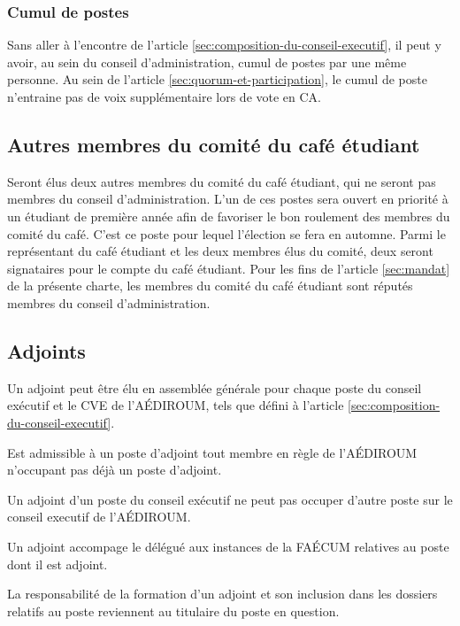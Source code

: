 \documentclass{aediroum}
\newcommand{\article}[1]{article \ref{#1}}
\begin{document}
\subsubsection{Cumul de postes}\label{sec:cumul-de-postes}

Sans aller à l'encontre de l'\article{sec:composition-du-conseil-executif}, il peut y avoir, au sein du conseil d'administration, cumul de postes par une même personne. Au sein de l'\article{sec:quorum-et-participation}, le cumul de poste n'entraine pas de voix supplémentaire lors de vote en CA.

\subsection{Autres membres du comité du café étudiant}\label{sec:autres-membres-du-comite-du-cafe-etudiant}

Seront élus deux autres membres du comité du café étudiant, qui ne seront pas membres du conseil d'administration. L'un de ces postes sera ouvert en priorité à un étudiant de première année afin de favoriser le bon roulement des membres du comité du café. C'est ce poste pour lequel l'élection se fera en automne. Parmi le représentant du café étudiant et les deux membres élus du comité, deux seront signataires pour le compte du café étudiant. Pour les fins de l'\article{sec:mandat} de la présente charte, les membres du comité du café étudiant sont réputés membres du conseil d'administration.

\subsection{Adjoints}\label{sec:adjoints}

Un adjoint peut être élu en assemblée générale pour chaque poste du conseil exécutif et le CVE de l'AÉDIROUM, tels que défini à l'\article{sec:composition-du-conseil-executif}.

Est admissible à un poste d'adjoint tout membre en règle de l'AÉDIROUM n'occupant pas déjà un poste d'adjoint.

Un adjoint d'un poste du conseil exécutif ne peut pas occuper d'autre poste sur le conseil executif de l'AÉDIROUM.

Un adjoint accompage le délégué aux instances de la FAÉCUM relatives au poste dont il est adjoint.

La responsabilité de la formation d'un adjoint et son inclusion dans les dossiers relatifs au poste reviennent au titulaire du poste en question.
\end{document}
